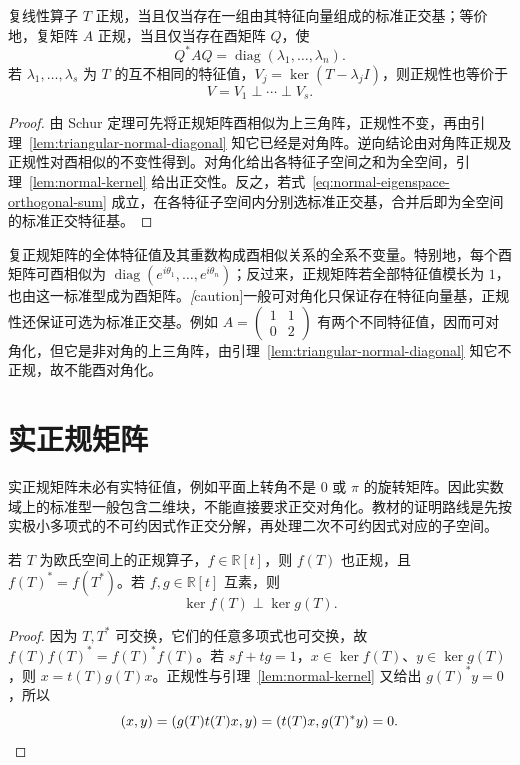 \begin{theorem}[复正规算子的标准型]
\label{thm:normal-unitary-diagonalization}
复线性算子 $T$ 正规，当且仅当存在一组由其特征向量组成的标准正交基；等价地，复矩阵 $A$ 正规，当且仅当存在酉矩阵 $Q$，使
\[
    Q^*AQ=\operatorname{diag}(\lambda_1,\ldots,\lambda_n).
\]
若 $\lambda_1,\ldots,\lambda_s$ 为 $T$ 的互不相同的特征值，$V_j=\ker(T-\lambda_jI)$，则正规性也等价于
\begin{equation}
\label{eq:normal-eigenspace-orthogonal-sum}
    V=V_1\mathbin\perp\cdots\mathbin\perp V_s.
\end{equation}
\end{theorem}
\begin{proof}
由 Schur 定理可先将正规矩阵酉相似为上三角阵，正规性不变，再由引理~\ref{lem:triangular-normal-diagonal} 知它已经是对角阵。逆向结论由对角阵正规及正规性对酉相似的不变性得到。对角化给出各特征子空间之和为全空间，引理~\ref{lem:normal-kernel} 给出正交性。反之，若式~\eqref{eq:normal-eigenspace-orthogonal-sum} 成立，在各特征子空间内分别选标准正交基，合并后即为全空间的标准正交特征基。
\end{proof}

复正规矩阵的全体特征值及其重数构成酉相似关系的全系不变量。特别地，每个酉矩阵可酉相似为 $\operatorname{diag}(e^{i\theta_1},\ldots,e^{i\theta_n})$；反过来，正规矩阵若全部特征值模长为 $1$，也由这一标准型成为酉矩阵。\emph[caution]{一般可对角化只保证存在特征向量基，正规性还保证可选为标准正交基}。例如 $A=\begin{pmatrix}1&1\\0&2\end{pmatrix}$ 有两个不同特征值，因而可对角化，但它是非对角的上三角阵，由引理~\ref{lem:triangular-normal-diagonal} 知它不正规，故不能酉对角化。

\section{实正规矩阵}
\label{sec:real-normal}

实正规矩阵未必有实特征值，例如平面上转角不是 $0$ 或 $\pi$ 的旋转矩阵。因此实数域上的标准型一般包含二维块，不能直接要求正交对角化。教材的证明路线是先按实极小多项式的不可约因式作正交分解，再处理二次不可约因式对应的子空间。

\begin{lemma}
\label{lem:real-normal-polynomial}
若 $T$ 为欧氏空间上的正规算子，$f\in\mathbb R[t]$，则 $f(T)$ 也正规，且 $f(T)^*=f(T^*)$。若 $f,g\in\mathbb R[t]$ 互素，则
\[
    \ker f(T)\perp\ker g(T).
\]
\end{lemma}
\begin{proof}
因为 $T,T^*$ 可交换，它们的任意多项式也可交换，故 $f(T)f(T)^*=f(T)^*f(T)$。若 $sf+tg=1$，$x\in\ker f(T)$、$y\in\ker g(T)$，则 $x=t(T)g(T)x$。正规性与引理~\ref{lem:normal-kernel} 又给出 $g(T)^*y=0$，所以
\[
    (x,y)=(g(T)t(T)x,y)=(t(T)x,g(T)^*y)=0.\qedhere
\]
\end{proof}

